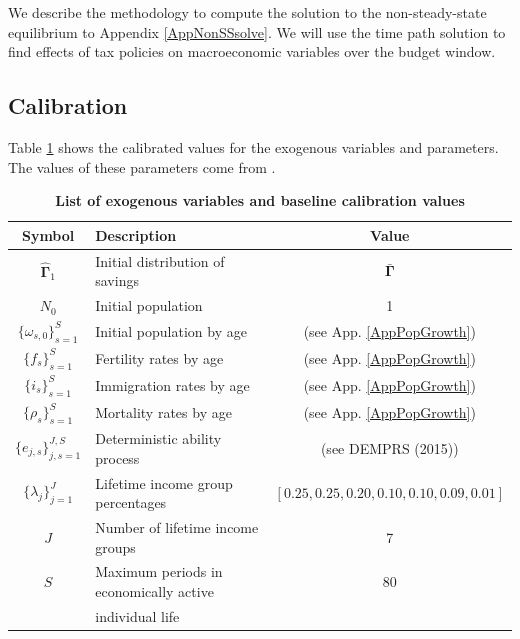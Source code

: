 \documentclass[letterpaper,12pt]{article}
\theoremstyle{definition}
\begin{document}
\begin{spacing}{1.5}
\vspace{10mm}
    
    We describe the methodology to compute the solution to the non-steady-state equilibrium to Appendix \ref{AppNonSSsolve}.  We will use the time path solution to find effects of tax policies on macroeconomic variables over the budget window.


  \subsection{Calibration}\label{SecCalib}

    Table \ref{TabExogVars} shows the calibrated values for the exogenous variables and parameters. The values of these parameters come from \citet{DEMPRS2015}.

    \begin{table}[htbp] \centering \captionsetup{width=4.7in}
    \caption{\label{TabExogVars}\textbf{List of exogenous variables and baseline calibration values}}
      \begin{threeparttable}
      \begin{tabular}{>{\footnotesize}c |>{\footnotesize}l |>{\footnotesize}c}
        \hline\hline
        Symbol & \quad\quad\quad\quad Description & Value \\
        \hline
        $\bm{\hat{\Gamma}}_1$ & Initial distribution of savings & $\bm{\bar{\Gamma}}$ \\
        $N_0$ & Initial population & 1 \\
        $\{\omega_{s,0}\}_{s=1}^S$ & Initial population by age & (see App. \ref{AppPopGrowth}) \\
        $\{f_s\}_{s=1}^S$ & Fertility rates by age & (see App. \ref{AppPopGrowth}) \\
        $\{i_s\}_{s=1}^S$ & Immigration rates by age & (see App. \ref{AppPopGrowth}) \\
        $\{\rho_s\}_{s=1}^S$ & Mortality rates by age & (see App. \ref{AppPopGrowth}) \\
        $\{e_{j,s}\}_{j,s=1}^{J,S}$ & Deterministic ability process & (see DEMPRS (2015)) \\
        $\{\lambda_j\}_{j=1}^J$ & Lifetime income group percentages & $[0.25,0.25,0.20,0.10,0.10,0.09,0.01]$ \\
        $J$ & Number of lifetime income groups & 7 \\
        $S$ & Maximum periods in economically active & 80 \\[-2mm]
        &\quad individual life & \\

\end{tabular}
\end{threeparttable}
\end{table}
\end{spacing}
\end{document}
